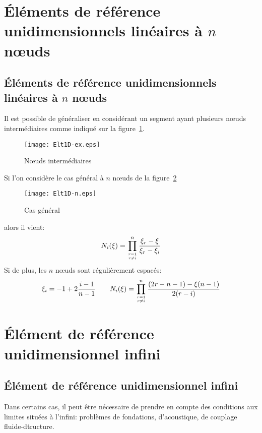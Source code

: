 \medskipvm
\ifVersionAvecExemplesSepares
   \section{Éléments de référence unidimensionnels linéaires à $n$ nœuds}
\else
   \subsection{Éléments de référence unidimensionnels linéaires à $n$ nœuds}
\fi

Il est possible de généraliser en considérant un segment ayant plusieurs nœuds 
intermédiaires comme indiqué sur la figure~\ref{fig:ex2:noeudint}.
\begin{figure}[ht]\centering
\texttt{[image: Elt1D-ex.eps]}
\caption{Nœuds  intermédiaires}\label{fig:ex2:noeudint}
\end{figure}
\medskipvm
Si l'on considère le cas général à $n$ nœuds de la figure~\ref{fig:ex2:casgen}
\begin{figure}[ht]\centering
\texttt{[image: Elt1D-n.eps]}
\caption{Cas général}\label{fig:ex2:casgen}
\end{figure}
alors il vient:
\begin{equation} N_i(\xi) = \prod_{r=1\atop r\ne i}^n \dfrac{\xi_r-\xi}{\xi_r-\xi_i} \end{equation}
\medskipvm
Si de plus, les $n$ nœuds sont régulièrement espacés:
\begin{equation}\xi_i = -1+2\frac{i-1}{n-1} \qquad
N_i(\xi) = \prod_{r=1\atop r\ne i}^n \dfrac{(2r-n-1)-\xi(n-1)}{2(r-i)} \end{equation}
\medskipvm
\ifVersionAvecExemplesSepares
   \section{Élément de référence unidimensionnel infini}
\else
   \subsection{Élément de référence unidimensionnel infini}
\fi
Dans certains cas, il peut être nécessaire de prendre en compte des conditions aux limites situées à
l'infini: problèmes de fondations, d'acoustique, de couplage fluide-dtructure.

